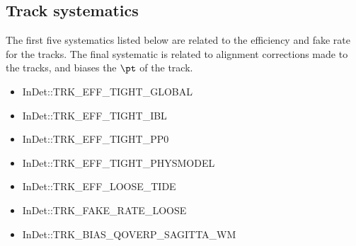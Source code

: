 \subsection{Track systematics}
The first five systematics listed below are related to the efficiency and fake rate for the tracks. The final systematic is related to alignment corrections made to the tracks, and biases the $\pt$ of the track. 
\begin{itemize}
  \item InDet::TRK\_EFF\_TIGHT\_GLOBAL
  \item InDet::TRK\_EFF\_TIGHT\_IBL
  \item InDet::TRK\_EFF\_TIGHT\_PP0
  \item InDet::TRK\_EFF\_TIGHT\_PHYSMODEL
  \item InDet::TRK\_EFF\_LOOSE\_TIDE
  \item InDet::TRK\_FAKE\_RATE\_LOOSE
  \item InDet::TRK\_BIAS\_QOVERP\_SAGITTA\_WM
\end{itemize}
